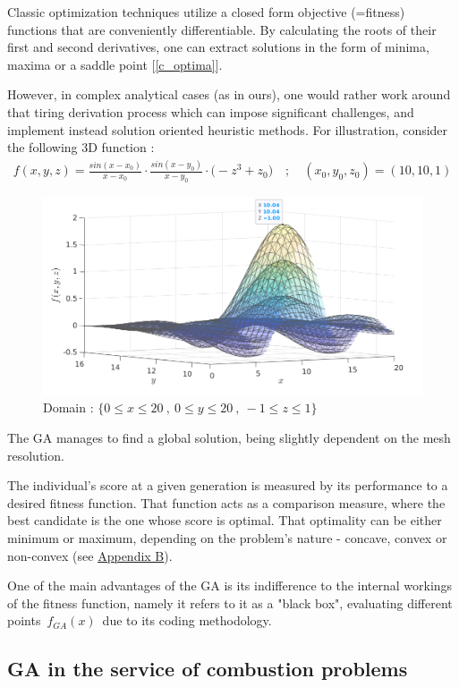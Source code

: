 \documentclass[12pt]{article}
\numberwithin{equation}{section}
\begin{document}
\begin{flushleft}
Classic optimization techniques utilize a closed form objective (=fitness) functions that are conveniently differentiable. By calculating the roots of their first and second derivatives, one can extract solutions in the form of minima, maxima or a saddle point [\ref{c_optima}]. 


However, in complex analytical cases (as in ours), one would rather work around that tiring derivation process which can impose significant challenges, and implement instead solution oriented heuristic methods. For illustration, consider the following 3D function : 
\begin{align*}
f(x, y, z) = \frac{sin(x-x_0)}{x-x_0} \cdot \frac{sin(x-y_0)}{x-y_0} \cdot \Big( -z^3 + z_0 \Big) \quad ; \quad ( x_0, y_0, z_0 ) = ( 10, 10, 1 )
\end{align*}

\begin{figure}[H]
\centering
\includegraphics[width=0.9\linewidth, center]{graph_3D.png}
\caption*{Domain : $\{ 0 \leq x \leq 20 \ , \ 0 \leq y \leq 20 \ , \ -1 \leq z \leq 1 \}$}
\end{figure}
The GA manages to find a global solution, being slightly dependent on the mesh resolution.

The individual's score at a given generation is measured by its performance to a desired fitness function. That function acts as a comparison measure, where the best candidate is the one whose score is optimal. That optimality can be either minimum or maximum, depending on the problem's nature - concave, convex or non-convex (see \hyperlink{app_convex}{Appendix B}).

One of the main advantages of the GA is its indifference to the internal workings of the fitness function, namely it refers to it as a "black box", evaluating different points \,$f_{GA}(x)$\, due to its coding methodology.

\subsection{GA in the service of combustion problems}


\end{flushleft}
\end{document}
